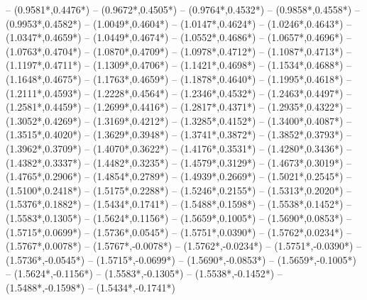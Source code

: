 {	-- ({0.9581*\dx},{0.4476*\dy})
	-- ({0.9672*\dx},{0.4505*\dy})
	-- ({0.9764*\dx},{0.4532*\dy})
	-- ({0.9858*\dx},{0.4558*\dy})
	-- ({0.9953*\dx},{0.4582*\dy})
	-- ({1.0049*\dx},{0.4604*\dy})
	-- ({1.0147*\dx},{0.4624*\dy})
	-- ({1.0246*\dx},{0.4643*\dy})
	-- ({1.0347*\dx},{0.4659*\dy})
	-- ({1.0449*\dx},{0.4674*\dy})
	-- ({1.0552*\dx},{0.4686*\dy})
	-- ({1.0657*\dx},{0.4696*\dy})
	-- ({1.0763*\dx},{0.4704*\dy})
	-- ({1.0870*\dx},{0.4709*\dy})
	-- ({1.0978*\dx},{0.4712*\dy})
	-- ({1.1087*\dx},{0.4713*\dy})
	-- ({1.1197*\dx},{0.4711*\dy})
	-- ({1.1309*\dx},{0.4706*\dy})
	-- ({1.1421*\dx},{0.4698*\dy})
	-- ({1.1534*\dx},{0.4688*\dy})
	-- ({1.1648*\dx},{0.4675*\dy})
	-- ({1.1763*\dx},{0.4659*\dy})
	-- ({1.1878*\dx},{0.4640*\dy})
	-- ({1.1995*\dx},{0.4618*\dy})
	-- ({1.2111*\dx},{0.4593*\dy})
	-- ({1.2228*\dx},{0.4564*\dy})
	-- ({1.2346*\dx},{0.4532*\dy})
	-- ({1.2463*\dx},{0.4497*\dy})
	-- ({1.2581*\dx},{0.4459*\dy})
	-- ({1.2699*\dx},{0.4416*\dy})
	-- ({1.2817*\dx},{0.4371*\dy})
	-- ({1.2935*\dx},{0.4322*\dy})
	-- ({1.3052*\dx},{0.4269*\dy})
	-- ({1.3169*\dx},{0.4212*\dy})
	-- ({1.3285*\dx},{0.4152*\dy})
	-- ({1.3400*\dx},{0.4087*\dy})
	-- ({1.3515*\dx},{0.4020*\dy})
	-- ({1.3629*\dx},{0.3948*\dy})
	-- ({1.3741*\dx},{0.3872*\dy})
	-- ({1.3852*\dx},{0.3793*\dy})
	-- ({1.3962*\dx},{0.3709*\dy})
	-- ({1.4070*\dx},{0.3622*\dy})
	-- ({1.4176*\dx},{0.3531*\dy})
	-- ({1.4280*\dx},{0.3436*\dy})
	-- ({1.4382*\dx},{0.3337*\dy})
	-- ({1.4482*\dx},{0.3235*\dy})
	-- ({1.4579*\dx},{0.3129*\dy})
	-- ({1.4673*\dx},{0.3019*\dy})
	-- ({1.4765*\dx},{0.2906*\dy})
	-- ({1.4854*\dx},{0.2789*\dy})
	-- ({1.4939*\dx},{0.2669*\dy})
	-- ({1.5021*\dx},{0.2545*\dy})
	-- ({1.5100*\dx},{0.2418*\dy})
	-- ({1.5175*\dx},{0.2288*\dy})
	-- ({1.5246*\dx},{0.2155*\dy})
	-- ({1.5313*\dx},{0.2020*\dy})
	-- ({1.5376*\dx},{0.1882*\dy})
	-- ({1.5434*\dx},{0.1741*\dy})
	-- ({1.5488*\dx},{0.1598*\dy})
	-- ({1.5538*\dx},{0.1452*\dy})
	-- ({1.5583*\dx},{0.1305*\dy})
	-- ({1.5624*\dx},{0.1156*\dy})
	-- ({1.5659*\dx},{0.1005*\dy})
	-- ({1.5690*\dx},{0.0853*\dy})
	-- ({1.5715*\dx},{0.0699*\dy})
	-- ({1.5736*\dx},{0.0545*\dy})
	-- ({1.5751*\dx},{0.0390*\dy})
	-- ({1.5762*\dx},{0.0234*\dy})
	-- ({1.5767*\dx},{0.0078*\dy})
	-- ({1.5767*\dx},{-0.0078*\dy})
	-- ({1.5762*\dx},{-0.0234*\dy})
	-- ({1.5751*\dx},{-0.0390*\dy})
	-- ({1.5736*\dx},{-0.0545*\dy})
	-- ({1.5715*\dx},{-0.0699*\dy})
	-- ({1.5690*\dx},{-0.0853*\dy})
	-- ({1.5659*\dx},{-0.1005*\dy})
	-- ({1.5624*\dx},{-0.1156*\dy})
	-- ({1.5583*\dx},{-0.1305*\dy})
	-- ({1.5538*\dx},{-0.1452*\dy})
	-- ({1.5488*\dx},{-0.1598*\dy})
	-- ({1.5434*\dx},{-0.1741*\dy})
}
